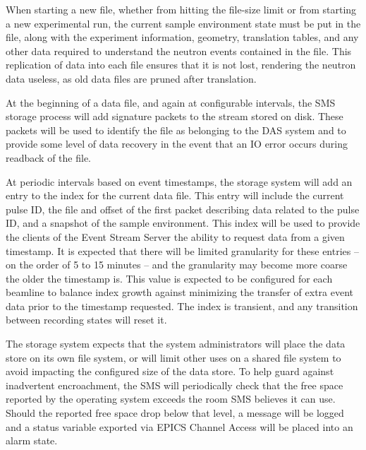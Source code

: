 When starting a new file, whether from hitting the file-size limit or from
starting a new experimental run, the current sample environment state must be 
put in the file, along with the experiment information, geometry, translation
tables, and any other data required to understand the neutron events contained
in the file. This replication of data into each file ensures that it is not
lost, rendering the neutron data useless, as old data files are pruned after
translation.

At the beginning of a data file, and again at configurable intervals, the SMS
storage process will add signature packets to the stream stored on disk. These
packets will be used to identify the file as belonging to the DAS system and to
provide some level of data recovery in the event that an IO error occurs during
readback of the file.

At periodic intervals based on event timestamps, the storage system will add an
entry to the index for the current data file. This entry will include the
current pulse ID, the file and offset of the first packet describing data
related to the pulse ID, and a snapshot of the sample environment. This index
will be used to provide the clients of the Event Stream Server the ability to
request data from a given timestamp. It is expected that there will be limited
granularity for these entries -- on the order of 5 to 15 minutes -- and the
granularity may become more coarse the older the timestamp is. This value is
expected to be configured for each beamline to balance index growth against
minimizing the transfer of extra event data prior to the timestamp requested.
The index is transient, and any transition between recording states will reset
it.

The storage system expects that the system administrators will place the
data store on its own file system, or will limit other uses on a shared
file system to avoid impacting the configured size of the data store. To
help guard against inadvertent encroachment, the SMS will periodically check
that the free space reported by the operating system exceeds the room
SMS believes it can use. Should the reported free space drop below that level,
a message will be logged and a status variable exported via EPICS Channel
Access will be placed into an alarm state.




